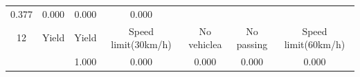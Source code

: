 \documentclass[11pt]{article}
\begin{document}
\begin{longtable}[]{@{}ccccccc@{}}
\begin{minipage}[t]{0.04\columnwidth}
0.377\strut
\end{minipage} & \begin{minipage}[t]{0.04\columnwidth}\centering\strut
0.000\strut
\end{minipage} & \begin{minipage}[t]{0.04\columnwidth}\centering\strut
0.000\strut
\end{minipage} & \begin{minipage}[t]{0.04\columnwidth}\centering\strut
0.000\strut
\end{minipage}\tabularnewline
\begin{minipage}[t]{0.04\columnwidth}\centering\strut
12\strut
\end{minipage} & \begin{minipage}[t]{0.04\columnwidth}\centering\strut
Yield\strut
\end{minipage} & \begin{minipage}[t]{0.04\columnwidth}\centering\strut
Yield\strut
\end{minipage} & \begin{minipage}[t]{0.04\columnwidth}\centering\strut
Speed limit(30km/h)\strut
\end{minipage} & \begin{minipage}[t]{0.04\columnwidth}\centering\strut
No vehiclea\strut
\end{minipage} & \begin{minipage}[t]{0.04\columnwidth}\centering\strut
No passing\strut
\end{minipage} & \begin{minipage}[t]{0.04\columnwidth}\centering\strut
Speed limit(60km/h)\strut
\end{minipage}\tabularnewline
\begin{minipage}[t]{0.04\columnwidth}\centering\strut
\strut
\end{minipage} & \begin{minipage}[t]{0.04\columnwidth}\centering\strut
\strut
\end{minipage} & \begin{minipage}[t]{0.04\columnwidth}\centering\strut
1.000\strut
\end{minipage} & \begin{minipage}[t]{0.04\columnwidth}\centering\strut
0.000\strut
\end{minipage} & \begin{minipage}[t]{0.04\columnwidth}\centering\strut
0.000\strut
\end{minipage} & \begin{minipage}[t]{0.04\columnwidth}\centering\strut
0.000\strut
\end{minipage} & \begin{minipage}[t]{0.04\columnwidth}\centering\strut
0.000\strut
\end{minipage}\tabularnewline
\bottomrule
\end{longtable}
\end{document}
